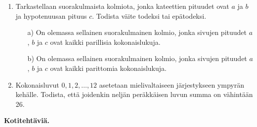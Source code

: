 \begin{enumerate}
\item
Tarkastellaan suorakulmaista kolmiota, jonka kateettien
pituudet ovat $a$ ja $b$ ja hypotenuusan pituus $c$.
Todista väite todeksi tai epätodeksi.

\begin{itemize}
\item[a)] On olemassa sellainen suorakulmainen kolmio,
jonka sivujen pituudet $a$, $b$ ja $c$ ovat kaikki parillisia kokonaislukuja.
\item[b)] On olemassa sellainen suorakulmainen kolmio,
jonka sivujen pituudet $a$, $b$ ja $c$ ovat kaikki 
parittomia kokonaislukuja.
\end{itemize}

\item Kokonaisluvut $0, 1, 2, \ldots, 12$ asetetaan
mielivaltaiseen järjestykseen ympyrän kehälle. Todista,
että joidenkin neljän peräkkäisen luvun summa on
vähintään 26.

\end{enumerate}

{\bf Kotitehtäviä.}

